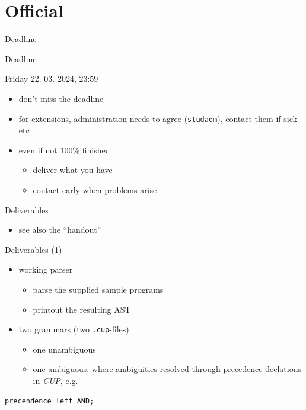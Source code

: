 \documentclass{beamer}
\begin{document}
\section{Official}
\label{sec:org68d4a96}

\begin{frame}[label={sec:org1022d07},fragile]{Deadline}
 \begin{alertblock}{Deadline}
\deadlineone

\alert{Friday 22. 03. 2024, 23:59}
\end{alertblock}
\begin{itemize}
\item don't miss the deadline
\item for extensions, administration needs to agree (\texttt{studadm}), contact them
if sick etc
\item even if not 100\% finished
\begin{itemize}
\item deliver what you have
\item contact early when problems arise
\end{itemize}
\end{itemize}
\end{frame}
\begin{frame}[label={sec:org55566f6},fragile]{Deliverables}
 \begin{itemize}
\item see also the ``handout''
\end{itemize}
\begin{block}{Deliverables (1)}
\begin{itemize}
\item working \alert{parser}
\begin{itemize}
\item parse the supplied sample programs
\item printout the resulting AST
\end{itemize}

\item \alert{two} grammars (two \texttt{.cup}-files)

\begin{itemize}
\item one unambiguous
\item one ambiguous, where ambiguities resolved through precedence
declations in \emph{CUP}, e.g.
\end{itemize}
\end{itemize}

\begin{verbatim}
precendence left AND;
\end{verbatim}
\end{block}
\end{frame}
\end{document}

